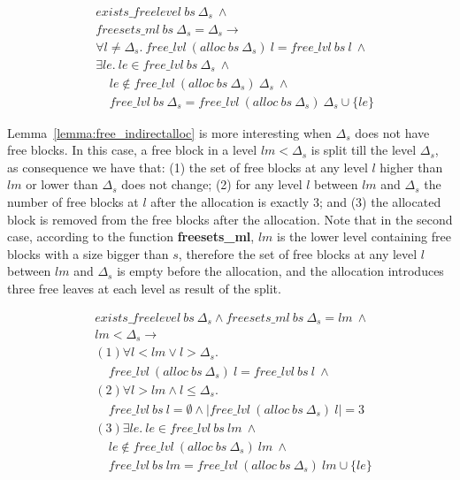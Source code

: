\begin{lemma} 
\label{lemma:free_directalloc}
\begin{align*}
&exists\_freelevel\ bs\ \Delta_s\ \wedge\\
&freesets\_ml\ bs\ \Delta_s = \Delta_s \longrightarrow\\
&\forall l \ne \Delta_s.\ free\_lvl\ (alloc\ bs\ \Delta_s)\ l =  free\_lvl\ bs\ l\ \wedge\\
&\exists le.\ le \in free\_lvl\ bs\ \Delta_s\ \wedge\\
&\ \ \ \ \ le \notin free\_lvl\ (alloc\ bs\ \Delta_s)\ \Delta_s\ \wedge\\
&\ \ \ \ \ free\_lvl\ bs\ \Delta_s =  free\_lvl\ (alloc\ bs\ \Delta_s)\ \Delta_s \cup \lbrace le \rbrace
\end{align*}
\end{lemma}

Lemma~\ref{lemma:free_indirectalloc} is more interesting when $\Delta_s$ does not have free blocks. In this case, a free block in a level $lm < \Delta_s$ is split till the level $\Delta_s$, as consequence we have that: (1) the set of free blocks at any level $l$ higher than $lm$ or lower than $\Delta_s$ does not change; (2) for any level $l$ between $lm$ and $\Delta_s$ the number of free blocks at $l$ after the allocation is exactly $3$; and (3) the allocated block is removed from the free blocks after the allocation. Note that in the second case, according to the function \textbf{freesets\_ml}, $lm$ is the lower level containing free blocks with a size bigger than $s$, therefore the set of free blocks at any level $l$ between $lm$ and $\Delta_s$ is empty before the allocation, and the allocation introduces three free leaves at each level as result of the split.
 
\begin{lemma} 
\label{lemma:free_indirectalloc}
\end{lemma}
\vspace{-7pt}
\begin{align*}
&exists\_freelevel\ bs\ \Delta_s \wedge freesets\_ml\ bs\ \Delta_s = lm\ \wedge\\
&lm < \Delta_s \longrightarrow\\
&(1) \forall l < lm \vee l > \Delta_s.\\
&\ \ \ \ \ free\_lvl\ (alloc\ bs\ \Delta_s)\ l = free\_lvl\ bs\ l\ \wedge\\
&(2) \forall l > lm \wedge l \le \Delta_s.\\
&\ \ \ \ \ free\_lvl\ bs\ l = \emptyset \wedge |free\_lvl\ (alloc\ bs\ \Delta_s)\ l| = 3\\
&(3) \exists le.\ le \in free\_lvl\ bs\ lm\ \wedge\\
&\ \ \ \ \ le \notin free\_lvl\ (alloc\ bs\ \Delta_s)\ lm\ \wedge\\
&\ \ \ \ \ free\_lvl\ bs\ lm = free\_lvl\ (alloc\ bs\ \Delta_s)\ lm \cup \lbrace le \rbrace\ 
\end{align*}

